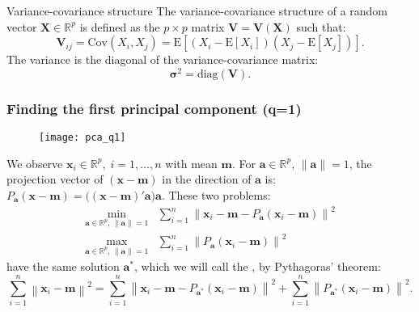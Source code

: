 \begin{definition}{Variance-covariance structure}{}
    The variance-covariance structure of a random vector $\boldsymbol{X} \in \mathbb{R}^p$
    is defined as the $p \times p$ matrix $\boldsymbol{V} = \boldsymbol{V}(\boldsymbol{X})$
    such that:
    \begin{equation*}
        \boldsymbol{V}_{ij} = \mathrm{Cov}(X_i,X_j) = \mathrm{E}[(X_i - \mathrm{E}[X_i])(X_j - \mathrm{E}[X_j])].
    \end{equation*}
    \tcblower
    The variance is the diagonal of the variance-covariance matrix:
    \begin{equation*}
        \boldsymbol{\sigma}^2 = \mathrm{diag}(\boldsymbol{V}).
    \end{equation*}
\end{definition}

\subsubsection{Finding the first principal component (q=1)}
\begin{figure}[H]
    \texttt{[image: pca\_q1]}
\end{figure}
We observe $\boldsymbol{x}_i \in \mathbb{R}^p,\;i=1,\ldots,n$ with mean $\boldsymbol{m}$.
For $\boldsymbol{a} \in \mathbb{R}^p,\, \lVert \boldsymbol a \rVert = 1$, the
projection vector of $(\boldsymbol{x} - \boldsymbol{m})$ in the direction of $\boldsymbol{a}$ is:
$P_{\boldsymbol{a}}(\boldsymbol{x} - \boldsymbol{m}) = \bigl( (\boldsymbol x - \boldsymbol m)' \boldsymbol a \bigr)
\boldsymbol{a}$. These two problems:
\begin{align*}
    \min_{\boldsymbol{a} \in \mathbb{R}^p,\, \lVert \boldsymbol a \rVert = 1} &\sum_{i=1}^n
        \left\lVert \boldsymbol{x}_i - \boldsymbol{m} - P_{\boldsymbol{a}}(\boldsymbol{x}_i - \boldsymbol{m}) \right\rVert^2 \tag{Minimizing the orthogonal residuals}\\
    \max_{\boldsymbol{a} \in \mathbb{R}^p,\, \lVert \boldsymbol a \rVert = 1} &\sum_{i=1}^n
        \left\lVert P_{\boldsymbol{a}}(\boldsymbol{x}_i - \boldsymbol{m}) \right\rVert^2
        \tag{Maximizing the inertia of the projected data}
\end{align*}
have the same solution $\boldsymbol{a}^*$, which we will call the ,
by Pythagoras' theorem:
\begin{equation*}
    \sum_{i=1}^n \left\lVert \boldsymbol{x}_i - \boldsymbol{m} \right\rVert^2
    = \sum_{i=1}^n \left\lVert
        \boldsymbol{x}_i - \boldsymbol{m} - P_{\boldsymbol{a}^*}(\boldsymbol{x}_i - \boldsymbol{m})
    \right\rVert^2
    + \sum_{i=1}^n \left\lVert P_{\boldsymbol{a}^*}(\boldsymbol{x}_i - \boldsymbol{m}) \right\rVert^2.
\end{equation*}

